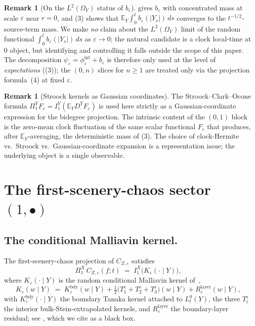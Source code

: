 \documentclass[11pt,reqno]{amsart}
\theoremstyle{plain}
\theoremstyle{definition}
\newtheorem{remark}[theorem]{Remark}
\theoremstyle{remark}
\newcommand{\E}{\mathbb{E}}
\newcommand{\IBM}{Z}
\newcommand{\Pir}{\Pi}
\begin{document}
\begin{remark}[On the \texorpdfstring{$L^{2}(\Omega_Y)$}{L2(Omega\_Y)} status of \texorpdfstring{$b_\varepsilon$}{b\_epsilon}]
\label{rem:b-eps-L2}
 gives $b_\varepsilon$ with concentrated mass at
scale $\varepsilon$ near $r=0$, and (3) shows
that $\E_Y\!\int_0^t b_\varepsilon(|Y_s|)\,ds$ converges to the
$t^{-1/2}$-source-term mass. We make \emph{no} claim about the
$L^{2}(\Omega_Y)$ limit of the random functional
$\int_0^t b_\varepsilon(|Y_s|)\,ds$ as $\varepsilon\to 0$; the
natural candidate is a clock local-time at $0$ object, but
identifying and controlling it falls outside the scope of this
paper. The decomposition $\psi_\varepsilon=\phi_\varepsilon^{\mathrm{int}}+b_\varepsilon$
is therefore only used at the level of \emph{expectations}
((3)); the $(0,n)$ slices for $n\ge 1$ are
treated only via the projection formula~(4)
at fixed $\varepsilon$.
\end{remark}

\begin{remark}[Stroock kernels as Gaussian coordinates]
\label{rem:stroock-as-coords}
The Stroock--Clark--Ocone formula
$\Pir_1^Y F_\varepsilon=I_1^Y(\E_Y D^Y_\cdot F_\varepsilon)$ is used
here strictly as a Gaussian-coordinate expression for the bidegree
projection. The intrinsic content of the $(0,1)$ block is the
zero-mean clock fluctuation of the same scalar functional
$F_\varepsilon$ that produces, after $\E_Y$-averaging, the
deterministic mass of (3). The choice of
clock-Hermite vs.\ Stroock vs.\ Gaussian-coordinate expansion is a
representation issue; the underlying object is a single observable.
\end{remark}

\section{The first-scenery-chaos sector \texorpdfstring{$(1,\bullet)$}{(1,*)}}\label{sec:first-chaos}

\subsection*{The conditional Malliavin kernel.}
The first-scenery-chaos projection of $C_{\IBM,\varepsilon}$
satisfies
\[
 \Pir_1^X\,C_{\IBM,\varepsilon}(f;t)
 \;=\;I_1^X\!\bigl(K_\varepsilon(\cdot\mid Y)\bigr),
\]
where $K_\varepsilon(\cdot\mid Y)$ is the random conditional
Malliavin kernel of~\cite[Sec.\ 3]{Fontes-FCDC},
\begin{equation}\label{eq:K-detail}
 K_\varepsilon(w\mid Y)
 \;=\;K_\varepsilon^{\mathrm{bdy}}(w\mid Y)
   +\tfrac12\bigl(T_1^\varepsilon+T_2^\varepsilon+T_3^\varepsilon\bigr)(w\mid Y)
   +R_\varepsilon^{\mathrm{layer}}(w\mid Y),
\end{equation}
with $K_\varepsilon^{\mathrm{bdy}}(\cdot\mid Y)$ the boundary
Tanaka kernel attached to $L_t^0(Y)$, the three $T_i^\varepsilon$ the
interior bulk-Stein-extrapolated kernels, and
$R_\varepsilon^{\mathrm{layer}}$ the boundary-layer residual; see
\cite[Sec.\ 3]{Fontes-FCDC}, which we cite as a black box.
\end{document}
